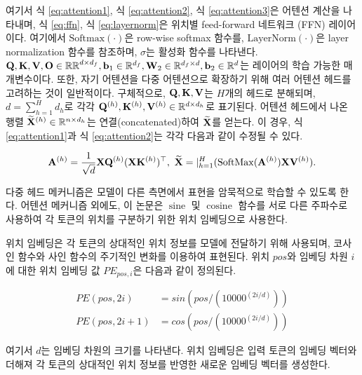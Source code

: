 \documentclass[
	11pt,
	a4paper,
	figtabcapt,
]{oblivoir}
\begin{document}
여기서 식 \ref{eq:attention1}, 식 \ref{eq:attention2}, 식 \ref{eq:attention3}은 어텐션 계산을 나타내며, 식 \ref{eq:ffn}, 식 \ref{eq:layernorm}은 위치별 feed-forward 네트워크 (FFN) 레이어이다.
여기에서 $\text{Softmax}(\cdot)$은 row-wise softmax 함수를, $\text{LayerNorm}(\cdot)$은 layer normalization 함수를 참조하며, $\sigma$는 활성화 함수를 나타낸다. $\mathbf{Q},\mathbf{K},\mathbf{V},\mathbf{O} \in \mathbb{RR}^{d\times d_f},\mathbf{b}_1 \in \mathbb{R}^{d_f},\mathbf{W}_2 \in \mathbb{R}^{d_f\times d} ,\mathbf{b}_2 \in \mathbb{R}^{d}$는 레이어의 학습 가능한 매개변수이다.
또한, 자기 어텐션을 다중 어텐션으로 확장하기 위해 여러 어텐션 헤드를 고려하는 것이 일반적이다. 구체적으로, $\mathbf{Q},\mathbf{K},\mathbf{V}$는 $H$개의 헤드로 분해되며, $d=\sum_{h=1}^{H}d_h$로 각각 $\mathbf{Q}^{(h)},\mathbf{K}^{(h)},\mathbf{V}^{(h)} \in \mathbb{R}^{d\times d_h}$로 표기된다. 어텐션 헤드에서 나온 행렬 $\widetilde{\mathbf{X}}^{(h)} \in \mathbb{R}^{n \times d_h}$는 연결(concatenated)하여 $\widetilde{\mathbf{X}}$를 얻는다. 이 경우, 식 \ref{eq:attention1}과 식 \ref{eq:attention2}는 각각 다음과 같이 수정될 수 있다.

\begin{align}
\mathbf{A}^{(h)}=\frac{1}{\sqrt{d}} \mathbf{X} \mathbf{Q}^{(h)}(\mathbf{X}\mathbf{K}^{(h)})^{\top}, \
\widetilde{\mathbf{X}}=|_{h=1}^{H}(\operatorname{SoftMax}(\mathbf{A}^{(h)}) \mathbf{X} \mathbf{V}^{(h)}).
\end{align}

다중 헤드 메커니즘은 모델이 다른 측면에서 표현을 암묵적으로 학습할 수 있도록 한다.
어텐션 메커니즘 외에도, 이 논문은 $\operatorname{sine}$ 및 $\operatorname{cosine}$ 함수를 서로 다른 주파수로 사용하여 각 토큰의 위치를 구분하기 위한 위치 임베딩으로 사용한다.

위치 임베딩은 각 토큰의 상대적인 위치 정보를 모델에 전달하기 위해 사용되며, 코사인 함수와 사인 함수의 주기적인 변화를 이용하여 표현된다. 위치 $pos$와 임베딩 차원 $i$에 대한 위치 임베딩 값 $PE_{pos,i}$은 다음과 같이 정의된다.


\begin{align}
	PE(pos, 2i) &= sin(pos / (10000 ^ {(2i / d)})) \\
	PE(pos, 2i+1) &= cos(pos / (10000 ^ {(2i / d)}))
\end{align}

여기서 $d$는 임베딩 차원의 크기를 나타낸다. 위치 임베딩은 입력 토큰의 임베딩 벡터와 더해져 각 토큰의 상대적인 위치 정보를 반영한 새로운 임베딩 벡터를 생성한다.

\clearpage
\end{document}

